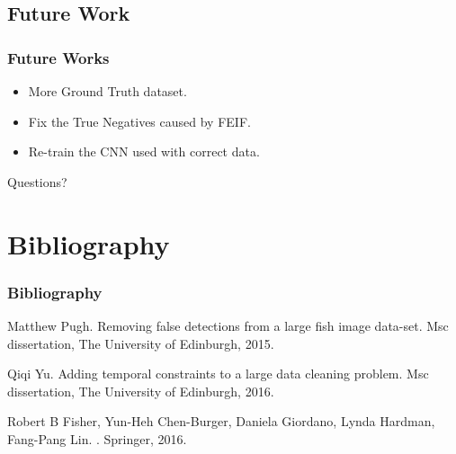 \documentclass{beamer}[fullspacing]
\begin{document}
\subsection{Future Work}
\begin{frame}
\frametitle{Future Works}
\begin{itemize}
\item
More Ground Truth dataset.
\item
Fix the True Negatives caused by FEIF.
\item
Re-train the CNN used with correct data.
\end{itemize}
\end{frame}


\begin{frame}
\begin{Huge}
\begin{center}
Questions?
\end{center}
\end{Huge}
\end{frame}




\section*{Bibliography}
\begin{frame}
\frametitle{Bibliography}
\begin{thebibliography}{3} %
Matthew Pugh.
\newblock Removing false detections from a large fish image data-set.
\newblock Msc dissertation, The University of Edinburgh, 2015.

Qiqi Yu.
\newblock Adding temporal constraints to a large data cleaning problem.
\newblock Msc dissertation, The University of Edinburgh, 2016.

Robert B Fisher{,} Yun-Heh Chen-Burger{,} Daniela Giordano{,} Lynda Hardman{,}
  Fang-Pang Lin.
.
\newblock Springer, 2016.

\end{thebibliography}
\end{frame}
\end{document}
